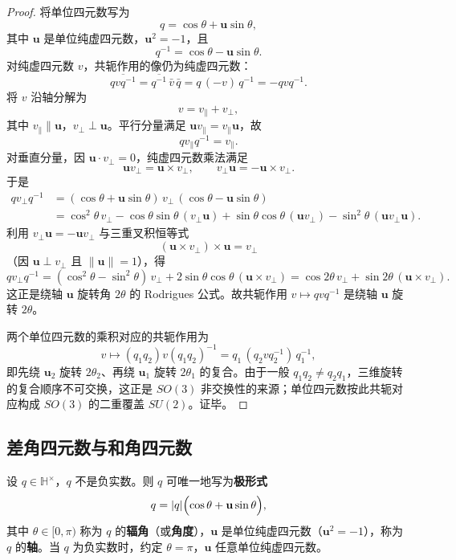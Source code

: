 \begin{proof}
将单位四元数写为
\[
q=\cos\theta+\mathbf u\sin\theta,
\]
其中 $\mathbf u$ 是单位纯虚四元数，$\mathbf u^2=-1$，且
\[
q^{-1}=\cos\theta-\mathbf u\sin\theta.
\]
对纯虚四元数 $v$，共轭作用的像仍为纯虚四元数：
\[
\overline{qvq^{-1}}
=
\overline{q^{-1}}\,\bar v\,\bar q
=
q\,(-v)\,q^{-1}
=
-qvq^{-1}.
\]
将 $v$ 沿轴分解为
\[
v=v_\parallel+v_\perp,
\]
其中 $v_\parallel\parallel \mathbf u$，$v_\perp\perp \mathbf u$。平行分量满足 $\mathbf u v_\parallel=v_\parallel \mathbf u$，故
\[
qv_\parallel q^{-1}=v_\parallel.
\]
对垂直分量，因 $\mathbf u\cdot v_\perp=0$，纯虚四元数乘法满足
\[
\mathbf u v_\perp=\mathbf u\times v_\perp,\qquad
v_\perp \mathbf u=-\mathbf u\times v_\perp.
\]
于是
\begin{align*}
qv_\perp q^{-1}
&=
(\cos\theta+\mathbf u\sin\theta)\,v_\perp\,(\cos\theta-\mathbf u\sin\theta) \\
&=
\cos^2\theta\,v_\perp
-\cos\theta\sin\theta\,(v_\perp \mathbf u)
+\sin\theta\cos\theta\,(\mathbf u v_\perp)
-\sin^2\theta\,(\mathbf u v_\perp \mathbf u).
\end{align*}
利用 $v_\perp \mathbf u=-\mathbf u v_\perp$ 与三重叉积恒等式
\[
(\mathbf u\times v_\perp)\times \mathbf u=v_\perp
\]
（因 $\mathbf u\perp v_\perp$ 且 $\|\mathbf u\|=1$），得
\[
qv_\perp q^{-1}
=
(\cos^2\theta-\sin^2\theta)\,v_\perp
+
2\sin\theta\cos\theta\,(\mathbf u\times v_\perp)
=
\cos 2\theta\,v_\perp
+
\sin 2\theta\,(\mathbf u\times v_\perp).
\]
这正是绕轴 $\mathbf u$ 旋转角 $2\theta$ 的 Rodrigues 公式。故共轭作用 $v\mapsto qvq^{-1}$ 是绕轴 $\mathbf u$ 旋转 $2\theta$。

两个单位四元数的乘积对应的共轭作用为
\[
v\longmapsto (q_1q_2)v(q_1q_2)^{-1}
=
q_1\,(q_2 v q_2^{-1})\,q_1^{-1},
\]
即先绕 $\mathbf u_2$ 旋转 $2\theta_2$、再绕 $\mathbf u_1$ 旋转 $2\theta_1$ 的复合。由于一般 $q_1q_2\neq q_2q_1$，三维旋转的复合顺序不可交换，这正是 $SO(3)$ 非交换性的来源；单位四元数按此共轭对应构成 $SO(3)$ 的二重覆盖 $SU(2)$。证毕。
\end{proof}

\subsection{差角四元数与和角四元数}

\begin{definition}[四元数的极形式与角度]\label{def:quaternion_polar}
设 $q\in\mathbb H^\times$，$q$ 不是负实数。则 $q$ 可唯一地写为\textbf{极形式}
\[
q=|q|\Bigl(\cos\theta+\mathbf u\sin\theta\Bigr),
\]
其中 $\theta\in[0,\pi)$ 称为 $q$ 的\textbf{辐角}（或\textbf{角度}），$\mathbf u$ 是单位纯虚四元数（$\mathbf u^2=-1$），称为 $q$ 的\textbf{轴}。当 $q$ 为负实数时，约定 $\theta=\pi$，$\mathbf u$ 任意单位纯虚四元数。
\end{definition}

